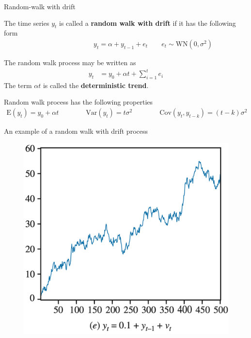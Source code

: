 \documentclass[10pt,aspectratio=169]{beamer}  %
\begin{document}

\begin{frame}{Random-walk with drift}

    \bigskip
    The time series $ y_{t} $ is called a \textbf{random walk with drift} if it has the following form
    \begin{align*}
        \qquad\qquad\qquad\qquad y_{t} = \alpha + y_{t-1} + e_{t} \qquad e_{t} \sim \text{WN} \left( 0, \sigma^{2} \right)
    \end{align*}

    The random walk process may be written as
    \begin{align*}
        y_{t} & = y_{0} + \alpha t + \sum_{i=1}^{t} e_{i}
    \end{align*}
    The term $ \alpha t $ is called the \textbf{deterministic trend}.

    \medskip
    Random walk process has the following properties
    \begin{align*}
        \mathrm{E} \left( y_{t} \right) = y_{0} + \alpha t \qquad\qquad \mathrm{Var} \left( y_{t} \right) = t \sigma^{2} \qquad\qquad \mathrm{Cov} \left( y_{t}, y_{t-k} \right) = \left( t-k \right) \sigma^{2}
    \end{align*}

\end{frame}


\begin{frame}{An example of a random walk with drift process}

    \bigskip
    \begin{figure}[H]
        \centering
        \includegraphics[height=0.5\textwidth]{./fig/random-walk-drift.png}
    \end{figure}

\end{frame}
\end{document}
